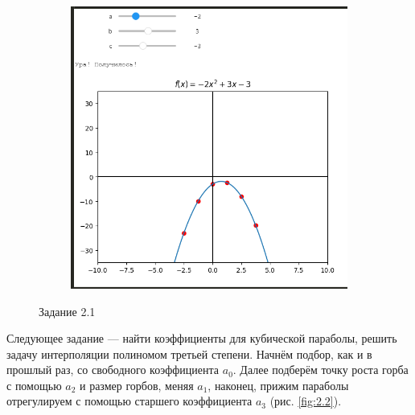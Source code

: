 \documentclass[14pt,a4paper]{extarticle}
\begin{document}
\begin{figure}[h!]
\begin{subfigure}{.5\textwidth}
        \includegraphics[width=0.9\linewidth]{figures//inftech//prac2/2.1-second.png}
    \end{subfigure}

    \caption{Задание 2.1}
    \label{fig:2.1}
\end{figure}

        Следующее задание --- найти коэффициенты для кубической параболы,
решить задачу интерполяции полиномом третьей степени. Начнём подбор, как
и в прошлый раз, со свободного коэффициента $a_0$. Далее подберём точку роста
горба с помощью $a_2$ и размер горбов, меняя $a_1$, наконец, прижим параболы
отрегулируем с помощью старшего коэффициента $a_3$ (рис. \ref{fig:2.2}).
\end{document}
